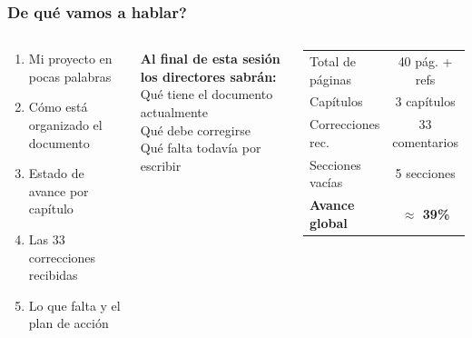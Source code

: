\documentclass[11pt, aspectratio=169, spanish]{beamer}
\newcommand{\semOK}{\textcolor{VerdeOk}{\faCheckCircle}}
\newcommand{\semWA}{\textcolor{AmarilloAv}{\faExclamationCircle}}
\newcommand{\semNO}{\textcolor{RojoAlerta}{\faTimesCircle}}
\begin{document}
\begin{frame}[plain]
\frametitle{\faClipboardList\quad \textquestiondown{}De qué vamos a hablar?}
\vspace{0.1cm}

\begin{columns}[T]

\begin{tcolorbox}[colback=VerdeUNAL!8, colframe=VerdeUNAL!70, arc=2mm,
  title={\footnotesize\textbf{Recorrido de la sesión}}]
\footnotesize
\begin{enumerate}[leftmargin=*, label=\textcolor{VerdeUNAL}{\textbf{\arabic*.}}, itemsep=3pt]
  \item \faProjectDiagram\quad Mi proyecto en pocas palabras
  \item \faMap\quad Cómo está organizado el documento
  \item \faChartBar\quad Estado de avance por capítulo
  \item \faCommentDots\quad Las 33 correcciones recibidas
  \item \faTasks\quad Lo que falta y el plan de acción
\end{enumerate}
\end{tcolorbox}

\vspace{0.18cm}

\begin{tcolorbox}[colback=GrisFondo, colframe=GrisClaro, arc=2mm]
{\footnotesize\textbf{Al final de esta sesión los directores sabrán:}\\[0.05cm]
\semOK\; {\small Qué tiene el documento actualmente}\\
\semWA\; {\small Qué debe corregirse}\\
\semNO\; {\small Qué falta todavía por escribir}}
\end{tcolorbox}


\begin{tcolorbox}[colback=GrisFondo, colframe=GrisClaro, arc=2mm,
  title={\footnotesize\textbf{\faChartPie\quad Resumen en cifras}}]
\vspace{0.1cm}
\begin{center}
\begin{tabular}{lc}
\scriptsize Total de páginas & \scriptsize 40 pág. + refs \\[4pt]
\scriptsize Capítulos & \scriptsize 3 capítulos \\[4pt]
\scriptsize Correcciones rec. & \scriptsize 33 comentarios \\[4pt]
\scriptsize Secciones vacías & \scriptsize 5 secciones \\[4pt]
\scriptsize\textbf{Avance global} & \scriptsize\textbf{\textcolor{VerdeUNAL}{$\approx$ 39\%}} \\
\end{tabular}


\end{center}
\end{tcolorbox}
\end{columns}
\end{frame}
\end{document}

